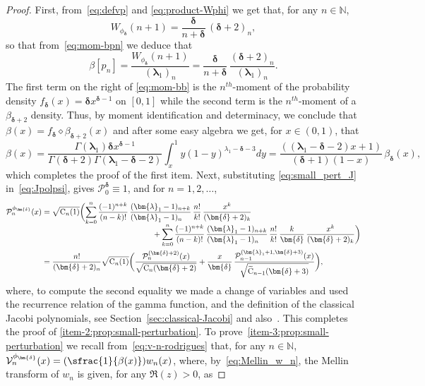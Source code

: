 \documentclass[JEP,XML,SOM,Unicode]{cedram}
\newcommand{\Psfrac}[2]{(\sfrac{#1}{#2})}
\theoremstyle{plain}
\theoremstyle{definition}
\newcommand{\N}{\mathbb{N}}
\renewcommand{\P}{\mathcal{P}}
\newcommand{\V}{\mathcal{V}}
\newcommand{\C}{{\mathrm{C}}}
\newcommand{\lam}{{\bm{\lambda}_1}}
\newcommand{\mm}{{\bm{\delta}}}
\newcommand{\gab}[1][\lam,\mo]{{\beta_{#1}}}
\let\mo\mu
\let\bpsi\beta
\begin{document}
\begin{proof}
First, from~\eqref{eq:defvp} and \eqref{eq:product-Wphi} we get that, for any $n \in \N$,
\begin{equation}
\label{eq:small_pert_J}
W_{\phi_{\mm}}(n+1) = \frac{\mm}{n+\mm}\, (\mm+2)_n,\end{equation}
so that from~\eqref{eq:mom-bpn} we deduce that
\begin{equation}
\label{eq:mom-bb}
\bpsi [p_n] = \frac{W_{\phi_{\mm}}(n+1)}{(\lam)_n} = \frac{\mm}{n+\mm}\, \frac{(\mm+2)_n}{(\lam)_n}.
\end{equation}
The first term on the right of \eqref{eq:mom-bb} is the $n^{th}$-moment of the probability density $f_\mm(x) = \mm x^{\mm-1}$ on $[0,1]$ while the second term is the $n^{th}$-moment of a $\gab[\mm+2]$ density. Thus, by moment identification and determinacy, we conclude that $\bpsi(x) = f_\mm \diamond \gab[\mm+2](x)$ and after some easy algebra we get, for $x \in (0,1)$, that
\begin{equation*}
\beta(x) = \frac{\Gamma(\lam)\mm x^{\mm-1}}{\Gamma(\mm+2)\Gamma(\lam-\mm-2)} \int_x^1 y (1-y)^{\lambda_1 - \mm - 3} dy
= \frac{((\lam - \mm - 2)x+1)}{(\mm+1)(1-x)}\, \gab[\mm](x),
\end{equation*}
which completes the proof of the first item. Next, substituting \eqref{eq:small_pert_J} in~\eqref{eq:Jpolpsi}, gives $\P_0^{\mm} \equiv 1$, and for $n = 1,2,\ldots$,
\begin{align*}
\P_n^{\phi_\mm}(x) &= \sqrt{\C_n(1)}\biggl( \sum_{k=0}^n \frac{(-1)^{n+k}}{(n-k)!}\, \frac{(\lam-1)_{n+k}}{(\lam-1)_{n\phantom{+k}}}\, \frac{n!}{k!}\, \frac{x^k}{(\mm+2)_k}\\[-5pt]
&\hspace*{5cm}+ \sum_{k=0}^n \frac{(-1)^{n+k}}{(n-k)!}\, \frac{(\lam-1)_{n+k}}{(\lam-1)_{n\phantom{+k}}}\, \frac{n!}{k!}\,\frac{k}{\mm}\, \frac{x^k}{(\mm+2)_k} \biggr) \\
&= \frac{n!}{(\mm+2)_n} \sqrt{\C_n(1)} \biggl( \frac{\P_n^{(\mm+2 )} (x)}{\sqrt{\C_n(\mm+2)}} + \frac{x}{\mm}\, \frac{\P_{n-1}^{(\lam+1,\mm+3)}(x)}{\sqrt{\widetilde{\C}_{n-1}(\mm+3)}} \biggr),
\end{align*}
where, to compute the second equality we made a change of variables and used the recurrence relation of the gamma function, and the definition of the classical Jacobi polynomials, see Section~\ref{sec:classical-Jacobi} and also~\cite{orthogonal_pols}. This completes the proof of \eqref{item-2:prop:small-perturbation}. To prove~\eqref{item-3:prop:small-perturbation} we recall from~\eqref{eq:v-n-rodrigues} that, for any $n \in \N$, $\V_n^{\phi_\mm}(x)= \Psfrac{1}{\beta(x)}w_n(x)$, where, by~\eqref{eq:Mellin_w_n}, the Mellin transform of $w_n$ is given, for any $\Re(z)>0$, as

\end{proof}
\end{document}
